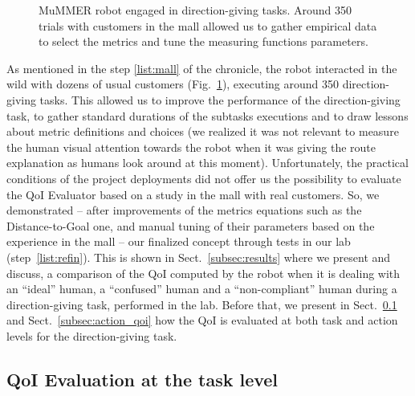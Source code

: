 \documentclass[a4paper,11pt,twoside]{StyleThese}
\begin{document}
\begin{figure}[!htp]
	\hfill
	\caption{MuMMER robot engaged in direction-giving tasks. Around 350 trials with customers in the mall allowed us to gather empirical data to select the metrics and tune the measuring functions parameters.}
	\label{fig:customers}
\end{figure}

As mentioned in the step \ref{list:mall} of the chronicle, the robot interacted in the wild with dozens of usual customers (Fig.~\ref{fig:customers}), executing around 350 direction-giving tasks. This allowed us to improve the performance of the direction-giving task, to gather standard durations of the subtasks executions and to draw lessons about metric definitions and choices (\eg we realized it was not relevant to measure the human visual attention towards the robot when it was giving the route explanation as humans look around at this moment). Unfortunately, the practical conditions of the project deployments did not offer us the possibility to evaluate the QoI Evaluator based on a study in the mall with real customers. So, we demonstrated -- after improvements of the metrics equations such as the Distance-to-Goal one, and manual tuning of their parameters based on the experience in the mall -- our finalized concept through tests in our lab (step~\ref{list:refin}). This is shown in Sect.~\ref{subsec:results} where we present and discuss, a comparison of the QoI computed by the robot when it is dealing with an ``ideal'' human, a ``confused'' human and a ``non-compliant'' human during a direction-giving task, performed in the lab. Before that, we present in Sect.~\ref{subsec:task_qoi} and Sect.~\ref{subsec:action_qoi} how the QoI is evaluated at both task and action levels for the direction-giving task.

\subsection{QoI Evaluation at the task level}\label{subsec:task_qoi}
\end{document}
